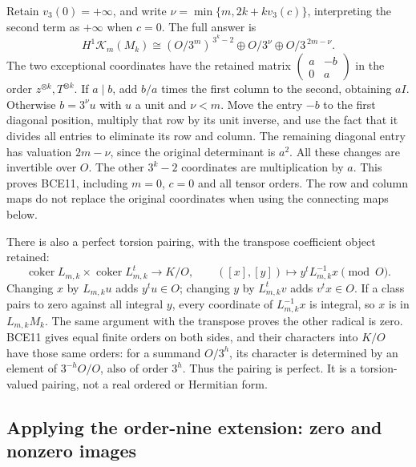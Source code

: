 Retain \(v_3(0)=+\infty\), and write
\(\nu=\min\{m,2k+kv_3(c)\}\), interpreting the second term as
\(+\infty\) when \(c=0\). The full answer is
\begin{equation}\tag{BCE11}
H^1\mathcal K_m(M_k)\cong
(O/3^m)^{\,3^k-2}\oplus O/3^\nu\oplus O/3^{\,2m-\nu}.
\end{equation}
The two exceptional coordinates have the retained matrix
\(\left(\begin{smallmatrix}a&-b\\0&a\end{smallmatrix}\right)\)
in the order \(z^{\otimes k},T^{\otimes k}\).
If \(a\mid b\), add \(b/a\) times the first column to the second,
obtaining \(aI\). Otherwise \(b=3^\nu u\) with \(u\) a unit and
\(\nu<m\). Move the entry \(-b\) to the first diagonal position,
multiply that row by its unit inverse, and use the fact that it
divides all entries to eliminate its row and column. The remaining
diagonal entry has valuation \(2m-\nu\), since the original
determinant is \(a^2\). All these changes are invertible over \(O\).
The other \(3^k-2\) coordinates are multiplication by \(a\).
This proves BCE11, including \(m=0\), \(c=0\) and all tensor orders.
The row and column maps do not replace the original coordinates
when using the connecting maps below.

There is also a perfect torsion pairing, with the transpose
coefficient object retained:
\begin{equation}\tag{BCE12}
\operatorname{coker}L_{m,k}\times\operatorname{coker}L_{m,k}^{t}
\longrightarrow K/O,\qquad
([x],[y])\longmapsto y^tL_{m,k}^{-1}x\pmod O .
\end{equation}
Changing \(x\) by \(L_{m,k}u\) adds \(y^tu\in O\);
changing \(y\) by \(L_{m,k}^tv\) adds \(v^tx\in O\).
If a class pairs to zero against all integral \(y\), every
coordinate of \(L_{m,k}^{-1}x\) is integral, so \(x\) is in
\(L_{m,k}M_k\). The same argument with the transpose proves the
other radical is zero. BCE11 gives equal finite orders on both
sides, and their characters into \(K/O\) have those same orders:
for a summand \(O/3^h\), its character is determined by an element
of \(3^{-h}O/O\), also of order \(3^h\). Thus the pairing is perfect.
It is a torsion-valued pairing, not a real ordered or Hermitian form.

\subsection{Applying the order-nine extension: zero and nonzero images}

